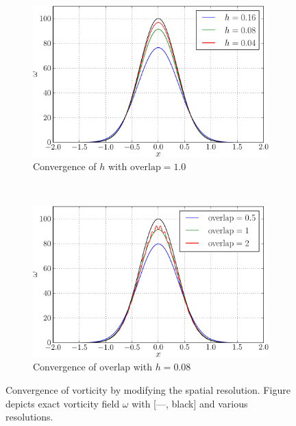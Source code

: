 \begin{figure}[t]
        \centering
        \begin{subfigure}[b]{0.5\textwidth}
                \includegraphics[width=\textwidth]{figures/lagrangian/betterInitialization_h-crop.pdf}
                \caption{Convergence of $h$ with $\mathrm{overlap} = 1.0$}
                \label{fig:convergenceOfBlobsH}
        \end{subfigure}%
        ~ %
        \begin{subfigure}[b]{0.5\textwidth}
                \includegraphics[width=\textwidth]{figures/lagrangian/betterInitialization_overlap-crop.pdf}
                \caption{Convergence of $\mathrm{overlap}$ with $h = 0.08$}
                \label{fig:convergenceOfBlobsOverlap}
        \end{subfigure}
        \caption{Convergence of vorticity by modifying the spatial resolution. Figure depicts exact vorticity field $\omega$ with [---, black] and various resolutions.}
        \label{fig:convergenceOfSpatialResolution}
\end{figure}	

